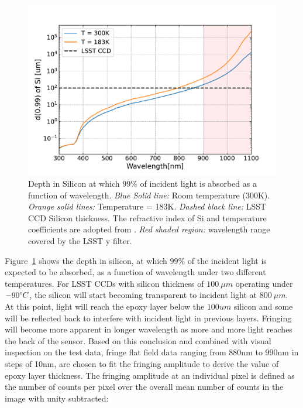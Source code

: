 \documentclass[twocolumn]{aastex63} %
\begin{document}
\begin{CJK*}{UTF8}{gbsn}
\begin{figure}[tb]
\centering
\includegraphics[scale = 0.41]{Si_Absorption_length.pdf}
\caption{Depth in Silicon at which $99\%$ of incident light is absorbed as a function of wavelength. {\it Blue Solid line:} Room temperature (300K). {\it Orange solid lines:} Temperature = 183K. {\it Dashed black line:} LSST CCD Silicon thickness. The refractive index of Si and temperature coefficients are adopted from \citet{Green08}. {\it Red shaded region:} wavelength range covered by the LSST y filter.} 
\label{fig:Si_ab_length}
\end{figure}
Figure~\ref{fig:Si_ab_length} shows the depth in silicon, at which $99\%$ of the incident light is expected to be absorbed, as a function of wavelength under two different temperatures. For LSST CCDs with silicon thickness of $100\ \mu m$ operating under $-90 \degree C$, the silicon will start becoming transparent to incident light at $800\ \mu m$. At this point, light will reach the epoxy layer below the $100um$ silicon and some will be reflected back to interfere with incident light in previous layers. Fringing will become more apparent in longer wavelength as more and more light reaches the back of the sensor. Based on this conclusion and combined with visual inspection on the test data, fringe flat field data ranging from 880nm to 990nm in steps of 10nm, are chosen to fit the fringing amplitude to derive the value of epoxy layer thickness. The fringing amplitude at an individual pixel is defined as the number of counts per pixel over the overall mean number of counts in the image with unity subtracted:


\end{CJK*}
\end{document}
